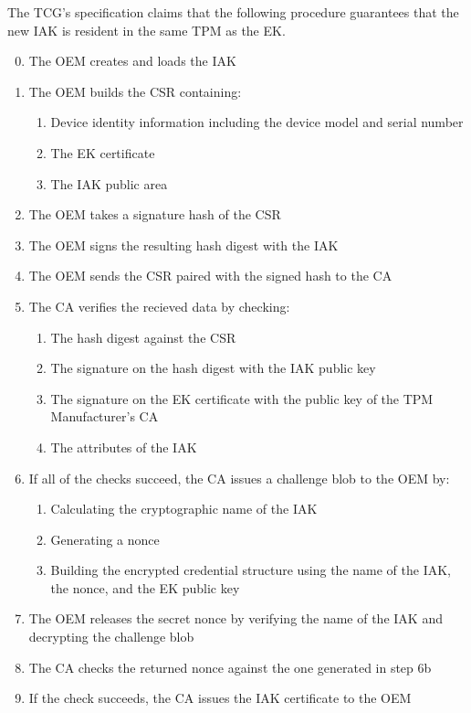 The TCG's specification claims that the following procedure guarantees that the new IAK is resident in the same TPM as the EK.
\begin{enumerate}[itemsep=0pt,parsep=0pt,partopsep=0pt]
  \setcounter{enumi}{-1}
  \item The OEM creates and loads the IAK
  \item The OEM builds the CSR containing:
  \begin{enumerate}[topsep=0pt, itemsep=0pt,parsep=0pt,partopsep=0pt]
    \item Device identity information including the device model and serial
    number
    \item The EK certificate
    \item The IAK public area
  \end{enumerate}
  \item The OEM takes a signature hash of the CSR
  \item The OEM signs the resulting hash digest with the IAK
  \item The OEM sends the CSR paired with the signed hash to the CA
  \item The CA verifies the recieved data by checking:
  \begin{enumerate}[topsep=0pt, itemsep=0pt,parsep=0pt,partopsep=0pt]
    \item The hash digest against the CSR
    \item The signature on the hash digest with the IAK public key
    \item The signature on the EK certificate with the public key of the TPM Manufacturer's CA
    \item The attributes of the IAK
  \end{enumerate}
  \item If all of the checks succeed, the CA issues a challenge blob to the OEM by:
  \begin{enumerate}[topsep=0pt, itemsep=0pt,parsep=0pt,partopsep=0pt]
    \item Calculating the cryptographic name of the IAK
    \item Generating a nonce
    \item Building the encrypted credential structure using the name of the IAK, the nonce, and the EK public key
  \end{enumerate}
  \item The OEM releases the secret nonce by verifying the name of the IAK and decrypting the challenge blob
  \item The CA checks the returned nonce against the one generated in step 6b
  \item If the check succeeds, the CA issues the IAK certificate to the OEM
\end{enumerate}

